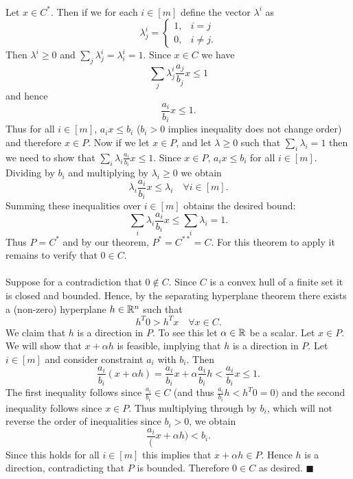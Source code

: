 \documentclass[letterpaper,12pt,oneside,onecolumn]{article}
\begin{document}
\paragraph{}
Let $x\in C^*$. Then if we for each $i \in [m]$ define the vector $\lambda^i$ as
$$\lambda^i_j = \begin{cases}
1, &i=j \\
0, &i\neq j.
\end{cases}$$
Then $\lambda^i \geq 0$ and $\sum_j \lambda^i_j = \lambda^i_i = 1$. Since $x \in C$ we have
$$\sum_{j}\lambda^i_j \frac{a_j}{b_j} x \leq 1$$
and hence
$$\frac{a_i}{b_i} x \leq 1.$$
Thus for all $i \in [m]$, $a_i x\leq b_i$ ($b_i > 0$ implies inequality does not change order) and therefore $x \in P$. Now if we let $x\in P$, and let $\lambda \geq 0$ such that $\sum_i \lambda_i = 1$ then we need to show that $\sum_i \lambda_i \frac{a_i}{b_i} x \leq 1$. Since $x \in P$, $a_i x \leq b_i$ for all $i \in [m]$. Dividing by $b_i$ and multiplying by $\lambda_i \geq 0$ we obtain
$$\lambda_i\frac{a_i}{b_i} x \leq \lambda_i \quad \forall i \in [m].$$
Summing these inequalities over $i\in[m]$ obtains the desired bound:
$$\sum_i \lambda_i \frac{a_i}{b_i}x \leq \sum_i \lambda_i = 1.$$
Thus $P= C^*$ and by our theorem, $P^* = C^{**} = C$. For this theorem to apply it remains to verify that $0 \in C$.
\paragraph{}
Suppose for a contradiction that $0 \not\in C$. Since $C$ is a convex hull of a finite set it is closed and bounded. Hence, by the separating hyperplane theorem there exists a (non-zero) hyperplane $h \in \mathbb{R}^n$ such that 
$$h^T0 > h^Tx \quad\forall x \in C.$$
We claim that $h$ is a direction in $P$. To see this let $\alpha \in \mathbb{R}$ be a scalar. Let $x \in P$.  We will show that $x + \alpha h$ is feasible, implying that $h$ is a direction in $P$. Let $ i \in [m]$ and consider constraint $a_i$ with $b_i$. Then
$$\frac{a_i}{b_i} (x + \alpha h) = \frac{a_i}{b_i}x + \alpha \frac{a_i}{b_i}h < \frac{a_i}{b_i}x \leq 1.$$
The first inequality follows since $\frac{a_i}{b_i} \in C$ (and thus $\frac{a_i}{b_i} h < h^T0 = 0)$ and the second inequality follows since $x \in P$. Thus multiplying through by $b_i$, which will not reverse the order of inequalities since $b_i > 0$, we obtain
$$\frac{a_i}(x + \alpha h) < b_i.$$
Since this holds for all $i \in [m]$ this implies that $x + \alpha h \in P$. Hence $h$ is a direction, contradicting that $P$ is bounded. Therefore $0\in C$ as desired. $\blacksquare$
\end{document}
